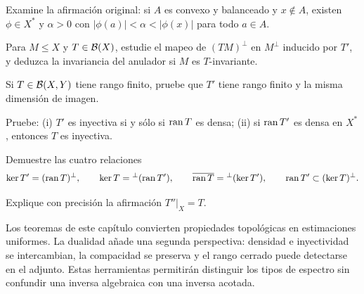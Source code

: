 \begin{ejercicio}\label{ej:v3-l04-2}
Examine la afirmación original: si $A$ es convexo y balanceado y $x\notin A$, existen $\phi\in X^*$ y $\alpha>0$ con $|\phi(a)|<\alpha<|\phi(x)|$ para todo $a\in A$.
\end{ejercicio}


\begin{ejercicio}\label{ej:v3-l04-3}
Para $M\le X$ y $T\in\mathcal B(X)$, estudie el mapeo de $(TM)^\perp$ en $M^\perp$ inducido por $T'$, y deduzca la invariancia del anulador si $M$ es $T$-invariante.
\end{ejercicio}


\begin{ejercicio}\label{ej:v3-l04-4}
Si $T\in\mathcal B(X,Y)$ tiene rango finito, pruebe que $T'$ tiene rango finito y la misma dimensión de imagen.
\end{ejercicio}


\begin{ejercicio}\label{ej:v3-l04-5}
Pruebe: (i) $T'$ es inyectiva si y sólo si $\operatorname{ran} T$ es densa; (ii) si $\operatorname{ran} T'$ es densa en $X^*$, entonces $T$ es inyectiva.
\end{ejercicio}


\begin{ejercicio}\label{ej:v3-l04-6}
Demuestre las cuatro relaciones
\[\ker T'=(\operatorname{ran} T)^\perp,\qquad \ker T={}^\perp(\operatorname{ran} T'),\qquad
\overline{\operatorname{ran} T}={}^\perp(\ker T'),\qquad \operatorname{ran} T'\subset(\ker T)^\perp.
\]
\end{ejercicio}


\begin{ejercicio}\label{ej:v3-l04-7}
Explique con precisión la afirmación $T''|_X=T$.
\end{ejercicio}


Los teoremas de este capítulo convierten propiedades topológicas en estimaciones uniformes. La dualidad añade una segunda perspectiva: densidad e inyectividad se intercambian, la compacidad se preserva y el rango cerrado puede detectarse en el adjunto. Estas herramientas permitirán distinguir los tipos de espectro sin confundir una inversa algebraica con una inversa acotada.
